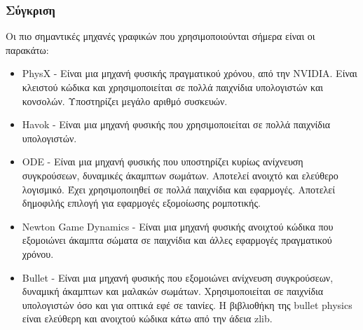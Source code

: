 \subsubsection{Σύγκριση}
Οι πιο σημαντικές μηχανές γραφικών που χρησιμοποιούνται σήμερα είναι οι παρακάτω:
\begin{itemize}
\item PhysX - Είναι μια μηχανή φυσικής πραγματικού χρόνου, από την NVIDIA. Είναι κλειστού κώδικα και χρησιμοποιείται σε πολλά παιχνίδια υπολογιστών και κονσολών. Υποστηρίζει μεγάλο αριθμό συσκευών.
\item Havok - Είναι μια μηχανή φυσικής που χρησιμοποιείται σε πολλά παιχνίδια υπολογιστών.
\item ODE - Είναι μια μηχανή φυσικής που υποστηρίζει κυρίως ανίχνευση συγκρούσεων, δυναμικές άκαμπτων σωμάτων. Αποτελεί ανοιχτό και ελεύθερο λογισμικό. Έχει χρησιμοποιηθεί σε πολλά παιχνίδια και εφαρμογές. Αποτελεί δημοφιλής επιλογή για εφαρμογές εξομοίωσης ρομποτικής.
\item Newton Game Dynamics - Είναι μια μηχανή φυσικής ανοιχτού κώδικα που εξομοιώνει άκαμπτα σώματα σε παιχνίδια και άλλες εφαρμογές πραγματικού χρόνου. 
\item Bullet - Είναι μια μηχανή φυσικής που εξομοιώνει ανίχνευση συγκρούσεων, δυναμική άκαμπτων και μαλακών σωμάτων. Χρησιμοποιείται σε παιχνίδια υπολογιστών όσο και για οπτικά εφέ σε ταινίες. Η βιβλιοθήκη της bullet physics είναι ελεύθερη και ανοιχτού κώδικα κάτω από την άδεια zlib.
\end{itemize}